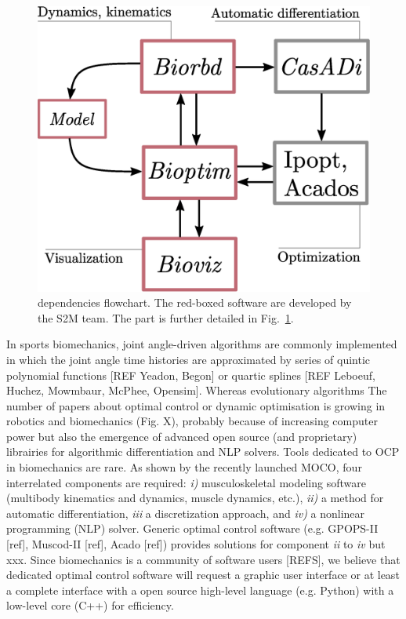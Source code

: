 \begin{figure}[t!]
\centering
\includegraphics[width=0.9\columnwidth]{figures/dependencies.eps}
\caption{\bioptim dependencies flowchart. The red-boxed software are developed by the S2M team. The \bioptim part is further detailed in Fig.~\ref{fig:dependencies}.}
\label{fig:dependencies}
\vspace*{-0.5cm}
\end{figure}


In sports biomechanics, joint angle-driven algorithms are commonly implemented in which the joint angle time histories are approximated by series of quintic polynomial functions [REF Yeadon, Begon] or quartic splines [REF Leboeuf, Huchez, Mowmbaur, McPhee, Opensim]. 
Whereas evolutionary algorithms 
The number of papers about optimal control or dynamic optimisation is growing in robotics and biomechanics (Fig. X), probably because of increasing computer power but also the emergence of advanced open source (and proprietary) librairies for algorithmic differentiation and NLP solvers. 
Tools dedicated to OCP in biomechanics are rare. As shown by the recently launched MOCO, four interrelated components are required: \textit{i)} musculoskeletal modeling software (multibody kinematics and dynamics, muscle dynamics, etc.), \textit{ii)} a method for automatic differentiation, \textit{iii} a discretization approach, and \textit{iv)} a nonlinear programming (NLP) solver. Generic optimal control software (e.g. GPOPS-II [ref], Muscod-II [ref], Acado [ref]) provides solutions for component \textit{ii} to \textit{iv} but xxx. Since biomechanics is a community of software users [REFS], we believe that dedicated optimal control software will request a graphic user interface or at least a complete interface with a open source high-level language (e.g. Python) with a low-level core (C++) for efficiency. 

